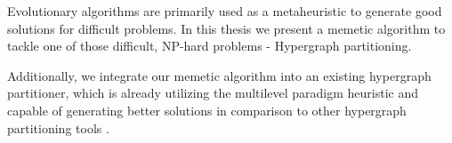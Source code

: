 \documentclass[a4paper,12pt,titlepage, BCOR7mm,headsepline]{scrbook}
\numberwithin{equation}{section}
\begin{document}
Evolutionary algorithms are primarily used as a metaheuristic to generate good solutions for difficult problems. In this thesis we present a memetic algorithm to tackle one of those difficult, NP-hard problems \cite{garey2002computers} - Hypergraph partitioning. 

Additionally, we integrate our memetic algorithm into an existing hypergraph partitioner, which is already utilizing the multilevel paradigm \cite{Multilevel paradigm} heuristic and capable of generating better solutions in comparison to other hypergraph partitioning tools \cite{schlag2016k}. 

%
%
%
%
%
%
\end{document}
